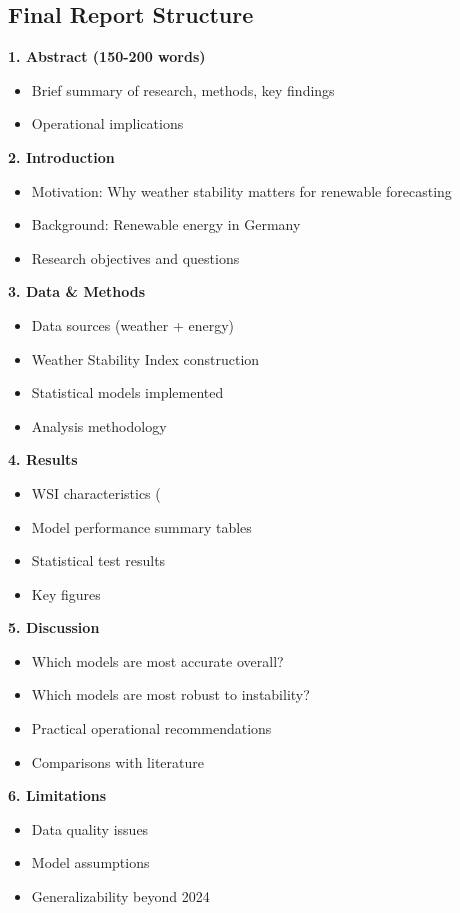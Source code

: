 \documentclass[11pt,a4paper]{article}
\begin{document}
\subsection{Final Report Structure}

\textbf{1. Abstract (150-200 words)}
\begin{itemize}
    \item Brief summary of research, methods, key findings
    \item Operational implications
\end{itemize}

\textbf{2. Introduction}
\begin{itemize}
    \item Motivation: Why weather stability matters for renewable forecasting
    \item Background: Renewable energy in Germany
    \item Research objectives and questions
\end{itemize}

\textbf{3. Data \& Methods}
\begin{itemize}
    \item Data sources (weather + energy)
    \item Weather Stability Index construction
    \item Statistical models implemented
    \item Analysis methodology
\end{itemize}

\textbf{4. Results}
\begin{itemize}
    \item WSI characteristics (%
    \item Model performance summary tables
    \item Statistical test results
    \item Key figures
\end{itemize}

\textbf{5. Discussion}
\begin{itemize}
    \item Which models are most accurate overall?
    \item Which models are most robust to instability?
    \item Practical operational recommendations
    \item Comparisons with literature
\end{itemize}

\textbf{6. Limitations}
\begin{itemize}
    \item Data quality issues
    \item Model assumptions
    \item Generalizability beyond 2024
\end{itemize}
\end{document}
